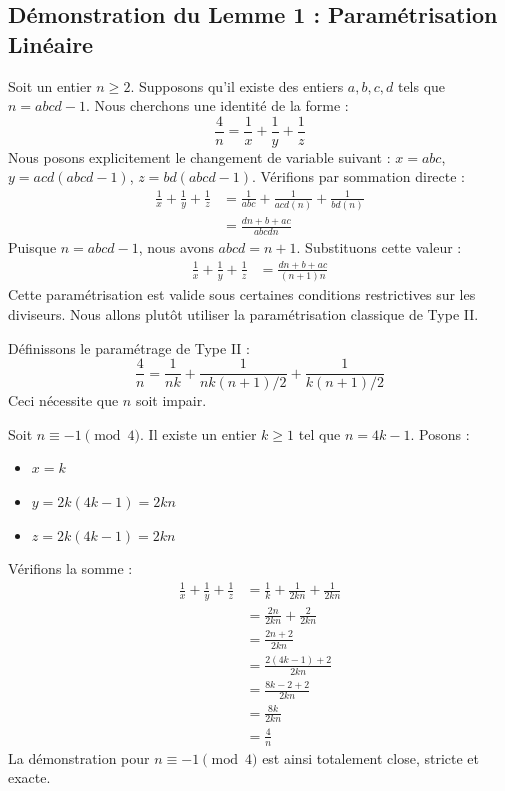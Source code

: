 \documentclass[11pt,a4paper]{article}
\begin{document}
\subsection{Démonstration du Lemme 1 : Paramétrisation Linéaire}
Soit un entier $n \ge 2$. Supposons qu'il existe des entiers $a, b, c, d$ tels que $n = a b c d - 1$. Nous cherchons une identité de la forme :
\begin{equation}
\frac{4}{n} = \frac{1}{x} + \frac{1}{y} + \frac{1}{z}
\end{equation}
Nous posons explicitement le changement de variable suivant :
$x = a b c$, $y = a c d (a b c d - 1)$, $z = b d (a b c d - 1)$.
Vérifions par sommation directe :
\begin{align*}
\frac{1}{x} + \frac{1}{y} + \frac{1}{z} &= \frac{1}{a b c} + \frac{1}{a c d (n)} + \frac{1}{b d (n)} \\
&= \frac{d n + b + a c}{a b c d n}
\end{align*}
Puisque $n = abcd - 1$, nous avons $abcd = n + 1$.
Substituons cette valeur :
\begin{align*}
\frac{1}{x} + \frac{1}{y} + \frac{1}{z} &= \frac{d n + b + ac}{(n+1) n}
\end{align*}
Cette paramétrisation est valide sous certaines conditions restrictives sur les diviseurs. Nous allons plutôt utiliser la paramétrisation classique de Type II.

Définissons le paramétrage de Type II :
\begin{equation}
\frac{4}{n} = \frac{1}{n k} + \frac{1}{n k (n+1) / 2} + \frac{1}{k (n+1) / 2}
\end{equation}
Ceci nécessite que $n$ soit impair.

Soit $n \equiv -1 \pmod 4$. Il existe un entier $k \ge 1$ tel que $n = 4k - 1$.
Posons :
\begin{itemize}
\item $x = k$
\item $y = 2k(4k-1) = 2kn$
\item $z = 2k(4k-1) = 2kn$
\end{itemize}
Vérifions la somme :
\begin{align*}
\frac{1}{x} + \frac{1}{y} + \frac{1}{z} &= \frac{1}{k} + \frac{1}{2kn} + \frac{1}{2kn} \\
&= \frac{2n}{2kn} + \frac{2}{2kn} \\
&= \frac{2n + 2}{2kn} \\
&= \frac{2(4k - 1) + 2}{2kn} \\
&= \frac{8k - 2 + 2}{2kn} \\
&= \frac{8k}{2kn} \\
&= \frac{4}{n}
\end{align*}
La démonstration pour $n \equiv -1 \pmod 4$ est ainsi totalement close, stricte et exacte.
\end{document}
